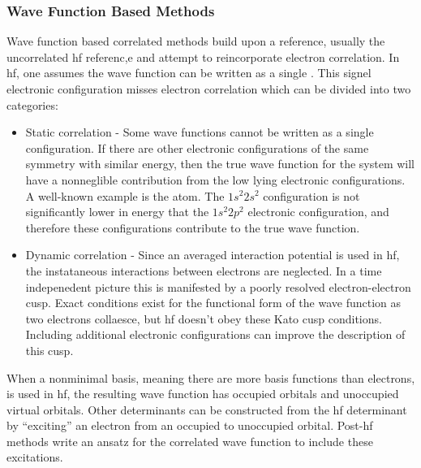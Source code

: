 \subsubsection{Wave Function Based Methods}
Wave function based correlated methods build upon a reference, usually the uncorrelated \gls{hf} referenc,e and attempt to reincorporate electron correlation.
In \gls{hf}, one assumes the wave function can be written as a single .
This signel electronic configuration misses electron correlation which can be divided into two categories:
\begin{itemize}
\item Static correlation - Some wave functions cannot be written as a single configuration. If there are other electronic configurations of the same symmetry with similar energy, then the true wave function for the system will have a nonneglible contribution from the low lying electronic configurations. A well-known example is the  atom. The $1s^2 2s^2$ configuration is not significantly lower in energy that the $1s^2 2p^2$ electronic configuration, and therefore these configurations contribute to the true wave function.\cite{10.1063/1.1669638, 10.1103/PhysRevA.4.908, 10.1103/PhysRevA.14.1965, 10.1103/PhysRevA.65.042507, 10.1063/1.477970}

\item Dynamic correlation - Since an averaged interaction potential is used in \gls{hf}, the instataneous interactions between electrons are neglected. In a time indepenedent picture this is manifested by a poorly resolved electron-electron cusp. Exact conditions exist for the functional form of the wave function as two electrons collaesce, but \gls{hf} doesn't obey these Kato cusp conditions.\cite{10.1002/cpa.3160100201} Including additional electronic configurations can improve the description of this cusp.
\end{itemize}

When a nonminimal basis, meaning there are more basis functions than electrons, is used in \gls{hf}, the resulting wave function has occupied orbitals and unoccupied virtual orbitals.
Other determinants can be constructed from the \gls{hf} determinant by ``exciting'' an electron from an occupied to unoccupied orbital.
Post-\gls{hf} methods write an ansatz for the correlated wave function to include these excitations.

